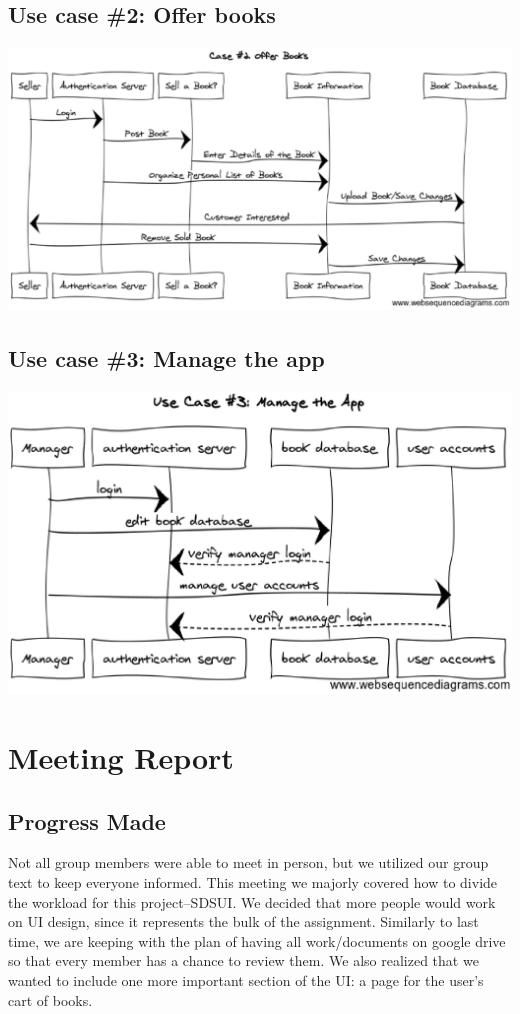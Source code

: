 \documentclass[12pt]{article}
\begin{document}
		\subsection{Use case \#2: Offer books}
		\includegraphics[width=14cm]{sequence_diagram2.eps}


		\subsection{Use case \#3: Manage the app}
		\includegraphics[width=14cm]{sequence_diagram3.eps}


	\section{Meeting Report}
		\subsection{Progress Made}
			Not all group members were able to meet in person, but we utilized our group text to keep everyone informed. 
			This meeting we majorly covered how to divide the workload for this project--SDSUI. 
			We decided that more people would work on UI design, since it represents the bulk of the assignment. 
			Similarly to last time, we are keeping with the plan of having all work/documents on google drive so that every member has a chance to review them. 
			We also realized that we wanted to include one more important section of the UI: a page for the user’s cart of books.
\end{document}
